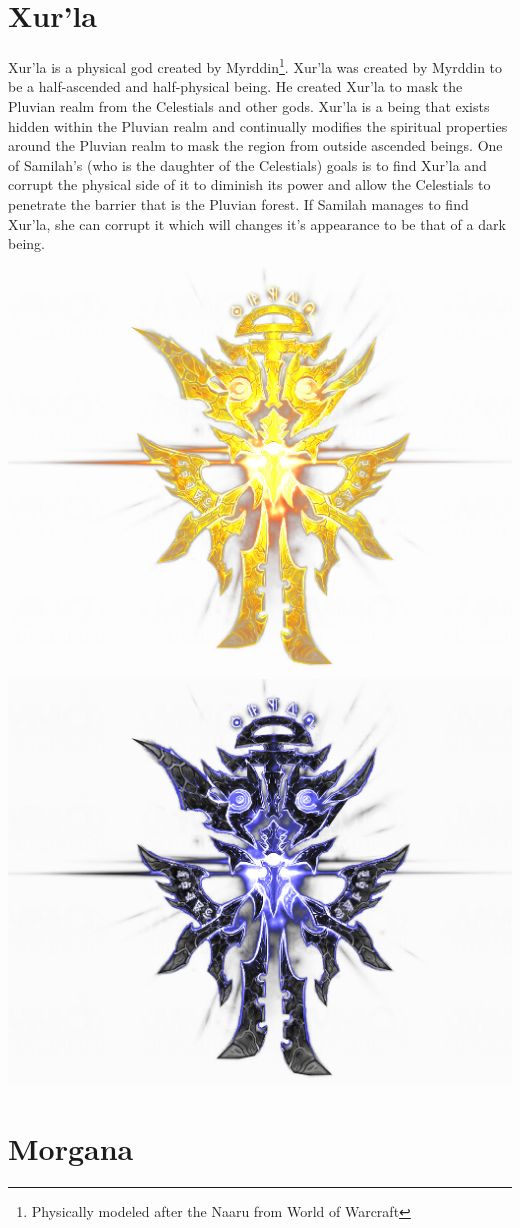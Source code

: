 \section{Xur'la}

Xur'la is a physical god created by Myrddin\footnote{Physically modeled after the Naaru from World of Warcraft}. Xur'la was created by Myrddin to be a half-ascended and half-physical being. He created Xur'la to mask the Pluvian realm from the Celestials and other gods. Xur'la is a being that exists hidden within the Pluvian realm and continually modifies the spiritual properties around the Pluvian realm to mask the region from outside ascended beings. One of Samilah's (who is the daughter of the Celestials) goals is to find Xur'la and corrupt the physical side of it to diminish its power and allow the Celestials to penetrate the barrier that is the Pluvian forest. If Samilah manages to find Xur'la, she can corrupt it which will changes it's appearance to be that of a dark being.

\begin{center}
	\includegraphics[width=0.49\linewidth]{img/WoW/LightMother-5.png} 	\includegraphics[width=0.49\linewidth]{img/WoW/LightMother-4.png}
\end{center}

\section{Morgana}


